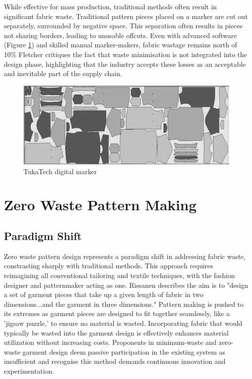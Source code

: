 While effective for mass production, traditional methods often result in significant fabric waste. Traditional pattern pieces placed on a marker are cut out separately, surrounded by negative space. This separation often results in pieces not sharing borders, leading to unusable offcuts.  Even with advanced software (Figure \ref{fig:digital_marker_layout}) and skilled manual marker-makers, fabric wastage remains north of 10\% Fletcher critiques the fact that waste minimisation is not integrated into the design phase, highlighting that the industry accepts these losses as an acceptable and inevitable part of the supply chain.
\begin{figure} [H]
    \centering
    \includegraphics[width=\textwidth]{Images/digital marker layout.png}
    \caption{TukaTech digital marker \cite{joseph-armstrong_patternmaking_2014}}
    \label{fig:digital_marker_layout}
\end{figure}

\section{Zero Waste Pattern Making}
\subsection{Paradigm Shift}
Zero waste pattern design represents a paradigm shift in addressing fabric waste, constrasting sharply with traditional methods. This approach requires reimagining all conventional tailoring and textile techniques, with the fashion designer and patternmaker acting as one. Rissanen describes the aim is to "design a set of garment pieces that take up a given length of fabric in two dimensions...and the garment in three dimensions." Pattern making is pushed to its extremes as garment pieces are designed to fit together seamlessly, like a 'jigsaw puzzle,' to ensure no material is wasted. Incorporating fabric that would typically be wasted into the garment design is effectively enhances material utilization without increasing costs. Proponents in minimum-waste and zero-waste garment design deem passive participation in the existing system as insufficient and recognise this method demands continuous innovation and experimentation.

